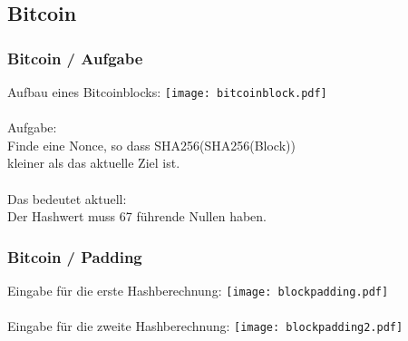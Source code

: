 \documentclass{beamer}
\begin{document}
  \subsection{Bitcoin}
    \begin{frame}
      \frametitle{Bitcoin / Aufgabe}
      Aufbau eines Bitcoinblocks:
      \texttt{[image: bitcoinblock.pdf]}\\
      ~\\
      Aufgabe:\\
      Finde eine Nonce, so dass SHA256(SHA256(Block))\\
      kleiner als das aktuelle Ziel ist.\\
      ~\\
      Das bedeutet aktuell:\\
      Der Hashwert muss 67 führende Nullen haben.
    \end{frame}
    \begin{frame}
      \frametitle{Bitcoin / Padding}
      Eingabe für die erste Hashberechnung:
      \texttt{[image: blockpadding.pdf]}\\
      ~\\
      Eingabe für die zweite Hashberechnung:
      \texttt{[image: blockpadding2.pdf]}\\
  \end{frame}
\end{document}
